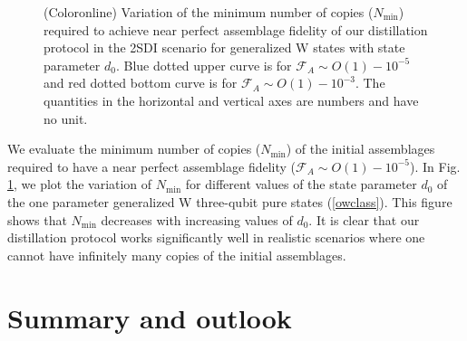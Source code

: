 \documentclass[reprint,superscriptaddress,nofootinbib,amsmath,amssymb,aps,pra,longbibliography]{revtex4-1}
\begin{document}
\begin{figure}[!t]
\caption{\footnotesize (Coloronline) Variation of the minimum number of copies ($N_{\text{min}}$) required to achieve near perfect assemblage fidelity of our
distillation protocol in the 2SDI scenario for generalized W states with state parameter $d_0$. Blue dotted upper curve is for $\mathcal{F}_{A} \sim O(1) - 10^{-5}$ and red dotted bottom curve is for $\mathcal{F}_{A} \sim O(1) - 10^{-3}$. The quantities in the horizontal and vertical axes are numbers and have no unit.}   
\label{N_min_W2S}
\end{figure}



We evaluate the minimum number of copies ($N_{\text{min}}$) of the initial assemblages required to have  a near perfect  assemblage fidelity ($\mathcal{F}_{A} \sim O(1) - 10^{-5}$). In Fig. \ref{N_min_W2S}, we plot the variation of $N_{\text{min}}$  for different values of the state parameter $d_0$ of the one parameter generalized W three-qubit pure states (\ref{owclass}). This figure shows that $N_{\text{min}}$ decreases with increasing values of $d_0$. It is clear that our distillation protocol works significantly well in realistic scenarios where one cannot have infinitely many copies of the initial assemblages.

 

\section{Summary and outlook}\label{section4}
\end{document}
